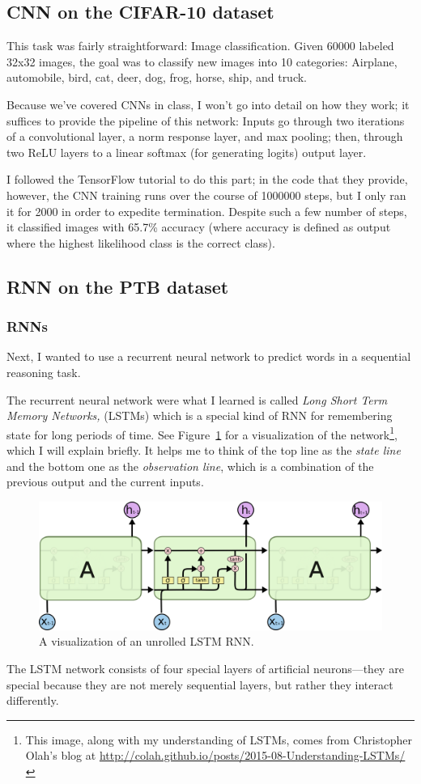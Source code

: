 \documentclass{journal}
\begin{document}
\subsection{CNN on the CIFAR-10 dataset}
This task was fairly straightforward: Image classification. Given 60000 labeled
32x32 images, the goal was to classify new images into 10 categories: Airplane,
automobile, bird, cat, deer, dog, frog, horse, ship, and truck.

Because we've covered CNNs in class, I won't go into detail on how they work; it
suffices to provide the pipeline of this network:
Inputs go through two iterations of a convolutional layer, a norm response
layer, and max pooling; then, through two ReLU layers to a linear
softmax (for generating logits) output layer.

I followed the TensorFlow tutorial
to do this part; in the code that they provide, however, the CNN training
runs over the course of 1000000 steps, but I only ran it for 2000 in order
to expedite termination. Despite such a few number of steps, it
classified images with 65.7\% accuracy (where accuracy is defined as
output where the highest likelihood class is the correct class).

\subsection{RNN on the PTB dataset}
\subsubsection{RNNs}
Next, I wanted to use a recurrent neural network to predict words in a
sequential reasoning task.

The recurrent neural network were what I learned is called \emph{Long Short
Term Memory Networks,} (LSTMs) which is a special kind of RNN for remembering
state for long periods of time. See Figure~\ref{fig:LSTM} for a visualization
of the network\footnote{This image, along with my understanding of LSTMs, comes
from Christopher Olah's blog at
\url{http://colah.github.io/posts/2015-08-Understanding-LSTMs/}},
which I will explain briefly. It helps me to think of the top line as the
\emph{state line} and the bottom one as the \emph{observation line}, which
is a combination of the previous output and the current inputs.
%
\begin{figure}[h]
    \includegraphics[width=\textwidth]{LSTM}
    \caption{A visualization of an unrolled LSTM RNN.}\label{fig:LSTM}
\end{figure}
%
The LSTM network consists of four special layers of artificial neurons---they
are special because they are not merely sequential layers, but rather they
interact differently.
\end{document}
